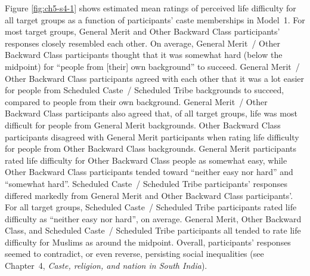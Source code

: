 \documentclass[12pt, a4paper]{article}
\begin{document}
Figure \ref{fig:ch5-s4-1} shows estimated mean ratings of perceived life difficulty for all target groups as a function of participants' caste memberships in Model~1. For most target groups, General Merit and Other Backward Class participants' responses closely resembled each other. On average, General Merit~/ Other Backward Class participants thought that it was somewhat hard (below the midpoint) for ``people from [their] own background'' to succeed. General Merit~/ Other Backward Class participants agreed with each other that it was a lot easier for people from Scheduled Caste~/ Scheduled Tribe backgrounds to succeed, compared to people from their own background. General Merit~/ Other Backward Class participants also agreed that, of all target groups, life was most difficult for people from General Merit backgrounds. Other Backward Class participants disagreed with General Merit participants when rating life difficulty for people from Other Backward Class backgrounds. General Merit participants rated life difficulty for Other Backward Class people as somewhat easy, while Other Backward Class participants tended toward ``neither easy nor hard'' and ``somewhat hard''. Scheduled Caste~/ Scheduled Tribe participants' responses differed markedly from General Merit and Other Backward Class participants'. For all target groups, Scheduled Caste~/ Scheduled Tribe participants rated life difficulty as ``neither easy nor hard'', on average. General Merit, Other Backward Class, and Scheduled Caste~/ Scheduled Tribe participants all tended to rate life difficulty for Muslims as around the midpoint. Overall, participants' responses seemed to contradict, or even reverse, persisting social inequalities (see Chapter~4, \emph{Caste, religion, and nation in South India}).
\end{document}

